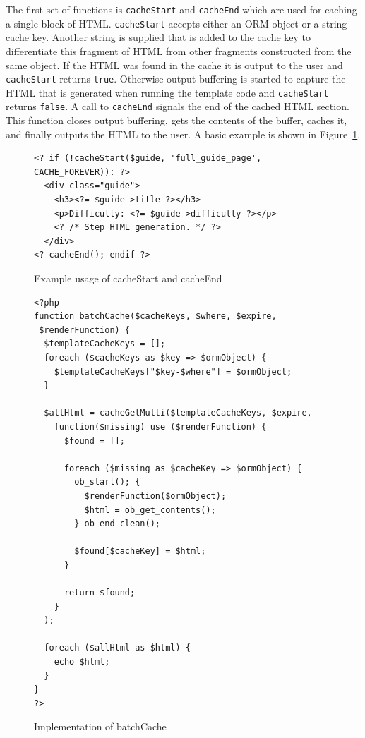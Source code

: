 \documentclass[12pt]{ucthesis}
\begin{document}
The first set of functions is {\tt cacheStart} and {\tt cacheEnd} which are used for caching a single block of HTML\@.
{\tt cacheStart} accepts either an ORM object or a string cache key.
Another string is supplied that is added to the cache key to differentiate this fragment of HTML from other fragments constructed from the same object.
If the HTML was found in the cache it is output to the user and {\tt cacheStart} returns {\tt true}.
Otherwise output buffering is started to capture the HTML that is generated when running the template code and {\tt cacheStart} returns {\tt false}.
A call to {\tt cacheEnd} signals the end of the cached HTML section.
This function closes output buffering, gets the contents of the buffer, caches it, and finally outputs the HTML to the user.
A basic example is shown in Figure~\ref{fig:cacheStartExample}.

\begin{figure}[h]
\begin{ssp}
\begin{verbatim}
<? if (!cacheStart($guide, 'full_guide_page', CACHE_FOREVER)): ?>
  <div class="guide">
    <h3><?= $guide->title ?></h3>
    <p>Difficulty: <?= $guide->difficulty ?></p>
    <? /* Step HTML generation. */ ?>
  </div>
<? cacheEnd(); endif ?>
\end{verbatim}
\caption{Example usage of cacheStart and cacheEnd}
\label{fig:cacheStartExample}
\end{ssp}
\end{figure}

\begin{figure}[hbtp]
\begin{ssp}
\begin{verbatim}
<?php
function batchCache($cacheKeys, $where, $expire,
 $renderFunction) {
  $templateCacheKeys = [];
  foreach ($cacheKeys as $key => $ormObject) {
    $templateCacheKeys["$key-$where"] = $ormObject;
  }

  $allHtml = cacheGetMulti($templateCacheKeys, $expire,
    function($missing) use ($renderFunction) {
      $found = [];

      foreach ($missing as $cacheKey => $ormObject) {
        ob_start(); {
          $renderFunction($ormObject);
          $html = ob_get_contents();
        } ob_end_clean();

        $found[$cacheKey] = $html;
      }

      return $found;
    }
  );

  foreach ($allHtml as $html) {
    echo $html;
  }
}
?>
\end{verbatim}
\caption{Implementation of batchCache}
\label{fig:batchCacheImplementation}
\end{ssp}
\end{figure}
\end{document}
